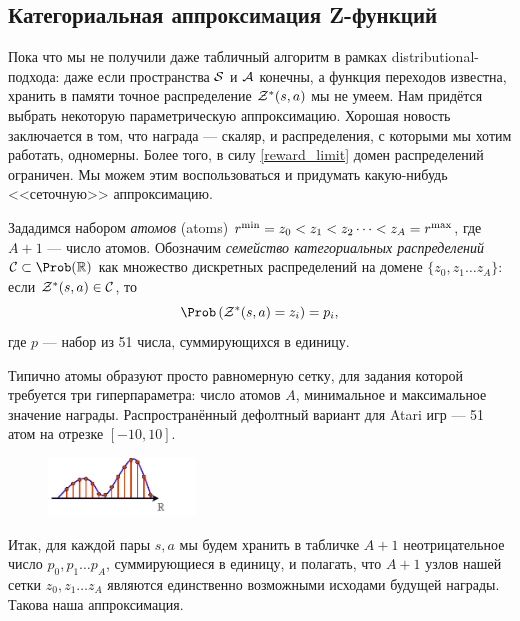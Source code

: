 \subsection{Категориальная аппроксимация Z-функций}

Пока что мы не получили даже табличный алгоритм в рамках distributional-подхода: даже если пространства $\mathcal{S}$ и $\mathcal{A}$ конечны, а функция переходов известна, хранить в памяти точное распределение $\mathcal{Z}^*(s, a)$ мы не умеем. Нам придётся выбрать некоторую параметрическую аппроксимацию. Хорошая новость заключается в том, что награда --- скаляр, и распределения, с которыми мы хотим работать, одномерны. Более того, в силу \eqref{reward_limit} домен распределений ограничен. Мы можем этим воспользоваться и придумать какую-нибудь <<сеточную>> аппроксимацию.

\begin{definition}
Зададимся набором \emph{атомов} (atoms) $r^{\min} = z_0 \HM< z_1 \HM< z_2 \dots < z_A = r^{\max}$, где $A + 1$ --- число атомов. Обозначим \emph{семейство категориальных распределений} $\mathcal{C} \subset \Prob(\R)$ как множество дискретных распределений на домене $\{z_0, z_1 \dots z_A\}$: если $\mathcal{Z}^*(s, a) \in \mathcal{C}$, то
$$\Prob \left( \Z^*(s, a) = z_i \right) = p_i,$$
где $p$ --- набор из 51 числа, суммирующихся в единицу.
\end{definition}

\begin{example}[c51]
Типично атомы образуют просто равномерную сетку, для задания которой требуется три гиперпараметра: число атомов $A$, минимальное и максимальное значение награды. Распространённый дефолтный вариант для Atari игр --- 51 атом на отрезке $[-10, 10]$.
\end{example}

\begin{figure}
\vspace{-0.3cm}
\centering
\includegraphics[width=0.35\textwidth]{Images/Categorical.png}
\vspace{-0.6cm}
\end{figure}
Итак, для каждой пары $s, a$ мы будем хранить в табличке $A + 1$ неотрицательное число $p_0, p_1 \dots p_A$, суммирующиеся в единицу, и полагать, что $A+1$ узлов нашей сетки $z_0, z_1 \dots z_A$ являются единственно возможными исходами будущей награды. Такова наша аппроксимация.

